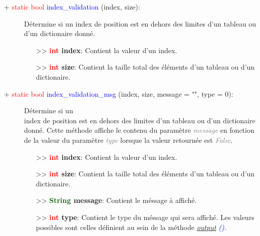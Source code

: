 \documentclass[a4paper, 11pt]{article}
\begin{document}
	\begin{description}
		\item [+ \textcolor{red}{static bool} \textcolor{blue}{index\_validation} (index, size):] Détermine 
		si un index de position est en dehors des limites d'un tableau ou d'un dictionaire donné.
		\begin{itemize}
			\item [>> \textbf{\textcolor{red}{int} index}:] Contient la valeur d'un index.
			\item [>> \textbf{\textcolor{red}{int} size}:] Contient la taille total des éléments d'un
			tableau ou d'un dictionaire.\\
		\end{itemize}
	\end{description}
	\begin{description}
		\item [+ \textcolor{red}{static bool} \textcolor{blue}{index\_validation\_msg} (index, size, message 
		= "", type = 0):] Détermine si un \\index de position est en dehors des limites d'un tableau ou d'un 
		dictionaire donné. Cette méthode affiche le contenu du paramètre \textit{\textcolor{gray}{message}} 
		en fonction de la valeur du paramètre \textit{\textcolor{gray}{type}} lorsque la valeur retournée 
		est \textit{\textcolor{gray}{False}}.
		\begin{itemize}
			\item [>> \textbf{\textcolor{red}{int} index}:] Contient la valeur d'un index.
			\item [>> \textbf{\textcolor{red}{int} size}:] Contient la taille total des éléments d'un
			tableau ou d'un dictionaire.
			\item [>> \textbf{\textcolor{darkgreen}{String} message}:] Contient le méssage à affiché.
			\item [>> \textbf{\textcolor{red}{int} type}:] Contient le type du méssage qui sera affiché. Les 
			valeurs possibles sont celles définient au sein de la méthode \textit{\textcolor{blue}
			{\hyperlink{output}{output} ()}}.\\
		\end{itemize}
	\end{description}
\end{document}
